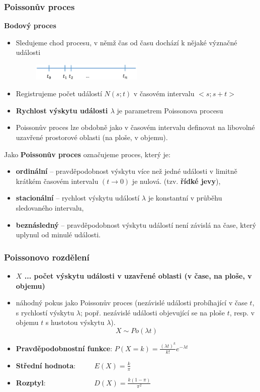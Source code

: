 \subsubsection{Poissonův proces}
\textbf{Bodový proces}
\begin{itemize}
	\item Sledujeme chod procesu, v němž čas od času dochází k nějaké význačné události \\
	\begin{figure}[H]
	\centering
	\includegraphics[width=0.5\textwidth]{assets/12_poisson_proces}
	\end{figure}
	\item Registrujeme počet událostí $N(s;t)$ v časovém intervalu $<s;s + t>$
	\item \textbf{Rychlost výskytu události $\lambda$} je parametrem Poissonova procesu
	\item Poissonův proces lze obdobně jako v časovém intervalu definovat na libovolné uzavřené prostorové oblasti (na ploše, v objemu).
\end{itemize}
Jako \textbf{Poissonův proces} označujeme proces, který je:
\begin{itemize}
	\item \textbf{ordinální} -- pravděpodobnost výskytu více než jedné události v limitně krátkém časovém intervalu $(t \to 0)$ je nulová. (tzv. \textbf{řídké jevy}),
	\item \textbf{stacionální} -- rychlost výskytu událostí $\lambda$ je konstantní v průběhu sledovaného intervalu,
	\item \textbf{beznásledný} -- pravděpodobnost výskytu událostí není závislá na čase, který uplynul od minulé události.
\end{itemize}

\subsubsection{Poissonovo rozdělení}
\begin{itemize}
	\item \textbf{$X$ ... počet výskytu události v uzavřené oblasti (v čase, na ploše, v objemu)}
	\item náhodný pokus jako Poissonův proces (nezávislé události probíhající v čase $t$, s rychlostí výskytu $\lambda$; popř. nezávislé události objevující se na ploše $t$, resp. v objemu $t$ s hustotou výskytu $\lambda$).
	$$X \sim Po(\lambda t)$$
	\item \textbf{Pravděpodobnostní funkce}: $P(X = k) = \frac{(\lambda t)^k}{k!}e^{-\lambda t}$
	\item \textbf{Střední hodnota}: $\qquad$ $E(X) = \frac{k}{\pi}$
	\item \textbf{Rozptyl}: $\qquad\qquad\qquad\;\; D(X) = \frac{k(1- \pi)}{\pi^2}$
\end{itemize}


